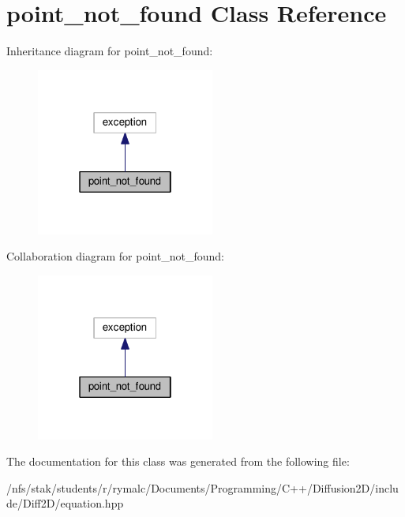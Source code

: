 \hypertarget{classpoint__not__found}{\section{point\+\_\+not\+\_\+found Class Reference}
\label{classpoint__not__found}
}


Inheritance diagram for point\+\_\+not\+\_\+found\+:\nopagebreak
\begin{figure}[H]
\begin{center}
\leavevmode
\includegraphics[width=166pt]{classpoint__not__found__inherit__graph}
\end{center}
\end{figure}


Collaboration diagram for point\+\_\+not\+\_\+found\+:\nopagebreak
\begin{figure}[H]
\begin{center}
\leavevmode
\includegraphics[width=166pt]{classpoint__not__found__coll__graph}
\end{center}
\end{figure}


The documentation for this class was generated from the following file\+:\begin{DoxyCompactItemize}
\item 
/nfs/stak/students/r/rymalc/\+Documents/\+Programming/\+C++/\+Diffusion2\+D/include/\+Diff2\+D/equation.\+hpp\end{DoxyCompactItemize}
